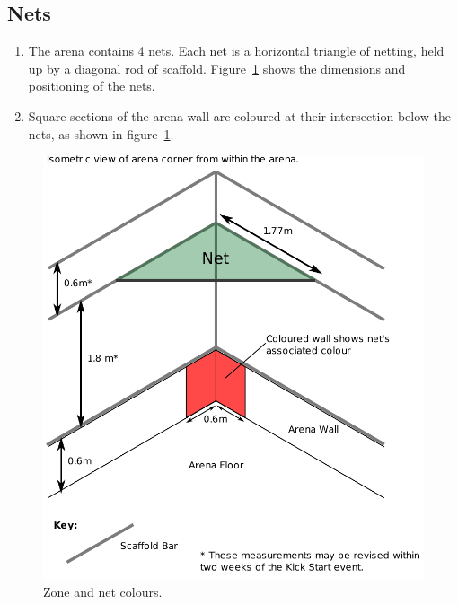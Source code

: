 \subsection{Nets}
\begin{enumerate}
\item The arena contains 4 nets.  Each net is a horizontal triangle of netting, held up by a diagonal rod of scaffold. Figure~\ref{fig:nets} shows the dimensions and positioning of the nets.
\item Square sections of the arena wall are coloured at their intersection below the nets, as shown in figure~\ref{fig:nets}.
\end{enumerate}

\begin{figure}
\begin{center}
\includegraphics[keepaspectratio, scale =1]{./images/net.pdf}
\caption{\label{fig:nets}Zone and net colours.}
\end{center}
\end{figure}

